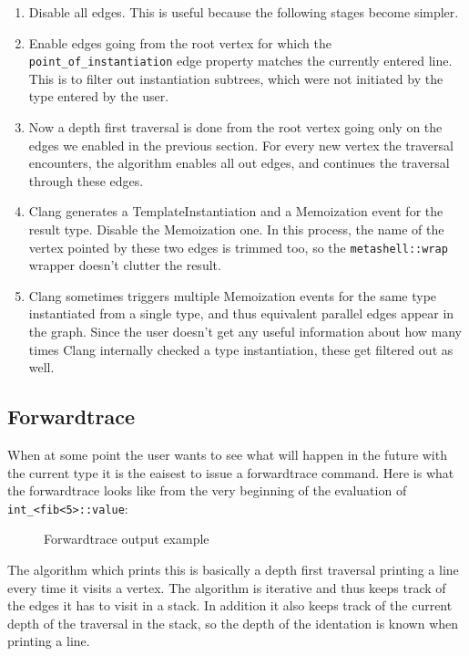 \begin{enumerate}
    \item
        Disable all edges. This is useful because the following stages become
        simpler.
    \item
        Enable edges going from the root vertex for which the
        \texttt{point\_of\_instantiation} edge property matches the currently
        entered line. This is to filter out instantiation subtrees, which were
        not initiated by the type entered by the user.
    \item
        Now a depth first traversal is done from the root vertex going only on
        the edges we enabled in the previous section. For every new vertex the
        traversal encounters, the algorithm enables all out edges, and
        continues the traversal through these edges.
    \item
        Clang generates a TemplateInstantiation and a Memoization event for the
        result type. Disable the Memoization one. In this process, the name of
        the vertex pointed by these two edges is trimmed too, so the
        \texttt{metashell::wrap} wrapper doesn't clutter the result.
    \item
        Clang sometimes triggers multiple Memoization events for the same type
        instantiated from a single type, and thus equivalent parallel edges
        appear in the graph. Since the user doesn't get any useful information
        about how many times Clang internally checked a type instantiation,
        these get filtered out as well.
\end{enumerate}

\subsection{Forwardtrace}

When at some point the user wants to see what will happen in the future with
the current type it is the eaisest to issue a forwardtrace command. Here is
what the forwardtrace looks like from the very beginning of the evaluation of
\texttt{int\_<fib<5>::value}:

\bigskip

\begin{figure}[H]
    
    \caption{Forwardtrace output example}
\end{figure}

\noindent
The algorithm which prints this is basically a depth first traversal printing
a line every time it visits a vertex. The algorithm is iterative and thus keeps
track of the edges it has to visit in a stack. In addition it also keeps track
of the current depth of the traversal in the stack, so the depth of the
identation is known when printing a line.

